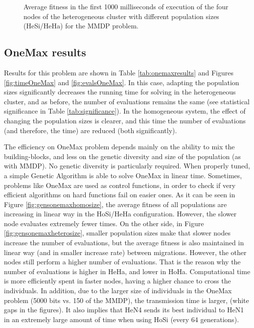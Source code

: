 \begin{figure*}
\centering
{} %
\caption{Average fitness in the first 1000 milliseconds of execution of the four nodes of the heterogeneous cluster with different population sizes (HeSi/HeHa) for the MMDP problem.}
\label{fig:hesiheha}
\end{figure*}



\subsection{OneMax results}

Results for this problem are shown in Table \ref{tab:onemaxresults} and Figures  \ref{fig:timeOneMax} and \ref{fig:evalsOneMax}. In this case, adapting the population sizes significantly decreases  the running time for solving in the heterogeneous cluster, and as before, the number of evaluations remains the same (see statistical significance in Table \ref{tab:significance}). In the homogeneous system, the effect of changing the population sizes is clearer, and this time the number of evaluations (and therefore, the time) are reduced (both significantly). 

The efficiency on OneMax problem depends mainly on the ability to mix
the building-blocks, and less on the genetic diversity and size of the
population (as with MMDP). No genetic diversity is particularly
required. When properly tuned, a simple Genetic Algorithm is able to
solve OneMax in linear time. Sometimes, problems like OneMax are used
as control functions, in order to check if very efficient algorithms
on hard functions fail on easier ones. As it can be seen in Figure
\ref{fig:gensonemaxhomosize}, the average fitness of all populations
are increasing in linear way in the HoSi/HeHa configuration. However,
the slower node evaluates extremely fewer times.  On the other
side, in Figure \ref{fig:gensonemaxheterosize}, smaller population
sizes make that slower nodes increase the number of evaluations,
but the average fitness is also maintained in linear way (and in
smaller increase rate) between migrations. However, the other
nodes still perform a higher number of evaluations. That is the
reason why the number of evaluations is higher in HeHa, and lower in
HoHa. Computational time is more efficiently spent in faster nodes,
having a higher chance to cross the individuals. In addition, due to
the larger size of  individuals in the OneMax problem (5000 bits
vs. 150 of the MMDP), the transmission time is larger, (white gaps in the
figures). It also implies that HeN4 sends its best individual to
HeN1 in an extremely large amount of time when using HoSi (every 64
generations). 

